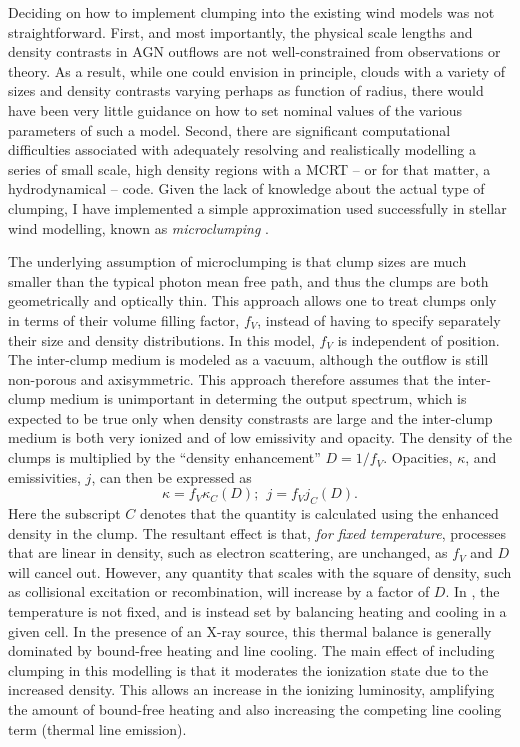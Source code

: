 Deciding on how to implement clumping into the existing wind models was not straightforward.
First, and most importantly, the physical scale lengths and density contrasts in AGN outflows are not well-constrained from observations or theory.  As a result, while one could envision in principle, clouds with a variety of sizes and density contrasts varying perhaps as function of radius, there would have been very little guidance on how to set nominal values of the various parameters of such a model.
Second, there are significant computational difficulties associated with adequately resolving and realistically modelling a series of small scale, high density regions with a MCRT
-- or for that matter, a hydrodynamical -- code. 
Given the lack of knowledge about the actual type of clumping, I have implemented
a simple approximation used successfully in stellar wind modelling, known as 
{\em microclumping} \citep[e.g.][]{hamann1998,hilliermiller1999,hamann2008}.  

The underlying assumption of microclumping is that clump sizes 
are much smaller than the 
typical photon mean free path, and thus the clumps are 
both geometrically and optically thin. This approach 
allows one to treat clumps only in terms of their volume filling factor, $f_V$, 
instead of having to specify separately their size and density distributions.
In this model, $f_V$ is independent of position.
The inter-clump medium is modeled as a vacuum,
although the outflow is still non-porous and axisymmetric.
This approach therefore assumes that the inter-clump medium
is unimportant in determing the output spectrum, which
is expected to be true only when density constrasts are large and
the inter-clump medium is both very ionized and of low emissivity and opacity.
The density of the clumps is multiplied by the ``density enhancement'' 
$D=1/f_V$. Opacities, $\kappa$, and emissivities, $j$, 
can then be expressed as 
\begin{equation}
\kappa = f_V \kappa_C(D);~~j = f_V j_C(D).
\end{equation}
Here the subscript $C$ denotes that the quantity is calculated using the 
enhanced density in the clump. The resultant effect is that, {\em for fixed temperature},
processes that are linear in density, such as electron scattering, are unchanged, 
as $f_V$ and $D$ will cancel out. However, any quantity that scales with the square of density, 
such as collisional excitation or recombination, will increase by a factor of $D$.
In \py, the temperature is not fixed, and is instead set by balancing heating and 
cooling in a given cell. In the presence of an X-ray source, this thermal balance is 
generally dominated by bound-free heating and line cooling. The main effect of including 
clumping in this modelling is that it moderates the ionization state due to the increased 
density. This allows an increase in the ionizing luminosity, amplifying the amount of
bound-free heating and also increasing the competing line cooling term
(thermal line emission).


